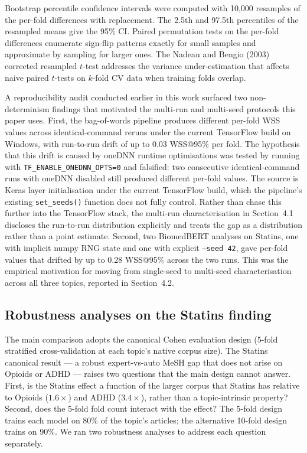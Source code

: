 \documentclass[11pt,a4paper]{article}
\begin{document}
Bootstrap percentile confidence intervals were computed with 10,000 resamples of the per-fold differences with replacement. The 2.5th and 97.5th percentiles of the resampled means give the 95\% CI. Paired permutation tests on the per-fold differences enumerate sign-flip patterns exactly for small samples and approximate by sampling for larger ones. The Nadeau and Bengio (2003) corrected resampled $t$-test addresses the variance under-estimation that affects naive paired $t$-tests on $k$-fold CV data when training folds overlap.

A reproducibility audit conducted earlier in this work surfaced two non-determinism findings that motivated the multi-run and multi-seed protocols this paper uses. First, the bag-of-words pipeline produces different per-fold WSS values across identical-command reruns under the current TensorFlow build on Windows, with run-to-run drift of up to 0.03 WSS@95\% per fold. The hypothesis that this drift is caused by oneDNN runtime optimisations was tested by running with \texttt{TF\_ENABLE\_ONEDNN\_OPTS=0} and falsified: two consecutive identical-command runs with oneDNN disabled still produced different per-fold values. The source is Keras layer initialisation under the current TensorFlow build, which the pipeline's existing \texttt{set\_seeds()} function does not fully control. Rather than chase this further into the TensorFlow stack, the multi-run characterisation in Section~4.1 discloses the run-to-run distribution explicitly and treats the gap as a distribution rather than a point estimate. Second, two BiomedBERT analyses on Statins, one with implicit numpy RNG state and one with explicit \texttt{--seed 42}, gave per-fold values that drifted by up to 0.28 WSS@95\% across the two runs. This was the empirical motivation for moving from single-seed to multi-seed characterisation across all three topics, reported in Section~4.2.

\subsection{Robustness analyses on the Statins finding}

The main comparison adopts the canonical Cohen evaluation design (5-fold stratified cross-validation at each topic's native corpus size). The Statins canonical result --- a robust expert-vs-auto MeSH gap that does not arise on Opioids or ADHD --- raises two questions that the main design cannot answer. First, is the Statins effect a function of the larger corpus that Statins has relative to Opioids ($1.6\times$) and ADHD ($3.4\times$), rather than a topic-intrinsic property? Second, does the 5-fold fold count interact with the effect? The 5-fold design trains each model on 80\% of the topic's articles; the alternative 10-fold design trains on 90\%. We ran two robustness analyses to address each question separately.
\end{document}
